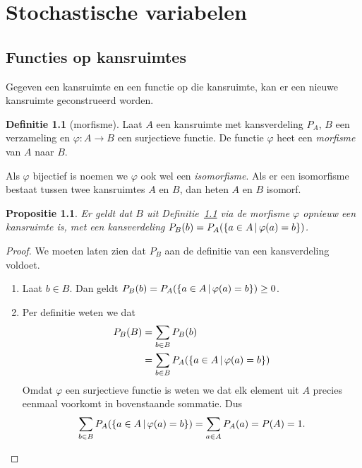 \documentclass[a4paper]{book}
\newtheorem{proposition}[theorem]{Propositie}
\theoremstyle{definition}
\newtheorem{definition}[theorem]{Definitie}
\begin{document}
\chapter{Stochastische variabelen}


\section{Functies op kansruimtes}
Gegeven een kansruimte en een functie op die kansruimte, kan er een nieuwe kansruimte geconstrueerd worden.

\begin{definition}[morfisme]\label{morfisme}
    Laat $A$ een kansruimte met kansverdeling $P_A$, $B$ een verzameling en $\varphi : A \to B$ een surjectieve functie.
    De functie $\varphi$ heet een \emph{morfisme} van $A$ naar $B$.

    Als $\varphi$ bijectief is noemen we $\varphi$ ook wel een \emph{isomorfisme}.
    Als er een isomorfisme bestaat tussen twee kansruimtes $A$ en $B$, dan heten $A$ en $B$ isomorf.
\end{definition}

\begin{proposition}\label{morfisme_codomein_kansruimte}
    Er geldt dat $B$ uit Definitie~\ref{morfisme} via de morfisme $\varphi$ opnieuw een kansruimte is,
    met een kansverdeling $P_B(b) = P_A(\set{a \in A}{\varphi(a) = b})$.
\end{proposition}
\begin{proof}
    We moeten laten zien dat $P_B$ aan de definitie van een kansverdeling voldoet.

    \begin{enumerate}[i]
        \item Laat $b \in B$. Dan geldt $P_B(b) =  P_A(\set{a \in A}{\varphi(a) = b}) \geq 0$.
        \item Per definitie weten we dat
        \begin{align*}
            P_B(B) &= \sum_{b \in B} P_B(b) \\
                   &= \sum_{b \in B} P_A(\set{a \in A}{\varphi(a) = b}) \\
        \end{align*}
        Omdat $\varphi$ een surjectieve functie is weten we dat elk element uit $A$ precies eenmaal voorkomt in bovenstaande sommatie.
        Dus \[ \sum_{b \in B} P_A(\set{a \in A}{\varphi(a) = b}) = \sum_{a \in A} P_A(a) = P(A) = 1. \]
    \end{enumerate}
\end{proof}
\end{document}
